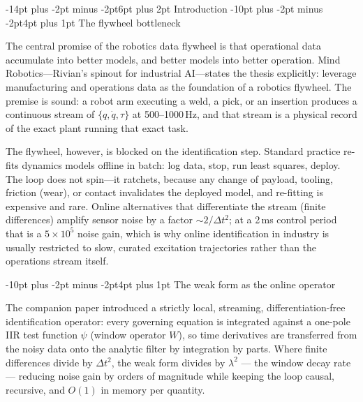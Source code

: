 \documentclass[10pt]{article}
\makeatletter
\renewcommand\section{\@startsection{section}{1}{\z@}%
  {-14pt plus -2pt minus -2pt}{6pt plus 2pt}%
  {\normalfont\bfseries\large}}
\renewcommand\subsection{\@startsection{subsection}{2}{\z@}%
  {-10pt plus -2pt minus -2pt}{4pt plus 1pt}%
  {\normalfont\bfseries\normalsize}}
\makeatother
\begin{document}
\section{Introduction}
\subsection{The flywheel bottleneck}

The central promise of the robotics data flywheel is that operational data
accumulate into better models, and better models into better operation.
Mind Robotics---Rivian's spinout for industrial AI---states the thesis
explicitly: leverage manufacturing and operations data as the foundation of a
robotics flywheel\cite{MindTC26}. The premise is sound: a robot arm executing
a weld, a pick, or an insertion produces a continuous stream of
$\{q,\dot q,\tau\}$ at 500--1000\,Hz, and that stream is a physical
record of the exact plant running that exact task.

The flywheel, however, is blocked on the identification step. Standard
practice re-fits dynamics models offline in batch\cite{Swevers07,Atkeson86}:
log data, stop, run least squares, deploy. The loop does not spin---it
ratchets, because any change of payload, tooling, friction (wear), or contact
invalidates the deployed model, and re-fitting is expensive and rare. Online
alternatives that differentiate the stream (finite differences) amplify sensor
noise by a factor $\sim 2/\Delta t^2$; at a 2\,ms control period that is a
$5\times10^5$ noise gain, which is why online identification in industry is
usually restricted to slow, curated excitation trajectories rather than the
operations stream itself.

\subsection{The weak form as the online operator}

The companion paper\cite{Companion26} introduced a strictly local, streaming,
differentiation-free identification operator: every governing equation is
integrated against a one-pole IIR test function $\psi$ (window operator $W$),
so time derivatives are transferred from the noisy data onto the analytic
filter by integration by parts. Where finite differences divide by $\Delta
t^2$, the weak form divides by $\lambda^2$ --- the window decay rate ---
reducing noise gain by orders of magnitude while keeping the loop causal,
recursive, and $O(1)$ in memory per quantity.
\end{document}

